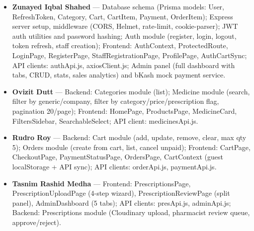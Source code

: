 \documentclass[12pt,a4paper]{article}
\begin{document}
\begin{itemize}[leftmargin=*,nosep]
    \item \textbf{Zunayed Iqbal Shahed} --- Database schema (Prisma models: User, RefreshToken, Category, Cart, CartItem, Payment, OrderItem); Express server setup, middleware (CORS, Helmet, rate-limit, cookie-parser); JWT auth utilities and password hashing; Auth module (register, login, logout, token refresh, staff creation); Frontend: AuthContext, ProtectedRoute, LoginPage, RegisterPage, StaffRegistrationPage, ProfilePage, AuthCartSync; API clients: authApi.js, axiosClient.js; Admin panel (full dashboard with tabs, CRUD, stats, sales analytics) and bKash mock payment service.

    \item \textbf{Ovizit Dutt} --- Backend: Categories module (list); Medicine module (search, filter by generic/company, filter by category/price/prescription flag, pagination 20/page); Frontend: HomePage, ProductsPage, MedicineCard, FiltersSidebar, SearchableSelect; API client: medicinesApi.js.

    \item \textbf{Rudro Roy} --- Backend: Cart module (add, update, remove, clear, max qty 5); Orders module (create from cart, list, cancel unpaid); Frontend: CartPage, CheckoutPage, PaymentStatusPage, OrdersPage, CartContext (guest localStorage + API sync); API clients: orderApi.js, paymentApi.js.

    \item \textbf{Tasnim Rashid Medha} --- Frontend: PrescriptionsPage, PrescriptionUploadPage (4-step wizard), PrescriptionReviewPage (split panel), AdminDashboard (5 tabs); API clients: presApi.js, adminApi.js; Backend: Prescriptions module (Cloudinary upload, pharmacist review queue, approve/reject).
\end{itemize}
\end{document}
